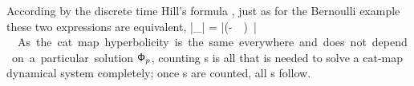 According by the discrete time Hill's formula , just as
for the Bernoulli example  these two expressions are
equivalent,
\beq
|\Det\jMorb_\Mm| = |\det(\unit-\jMps_\Mm)|
\,.
As the cat map hyperbolicity is the same everywhere and
does not depend on a particular solution $\mathsf{\Phi}_p$, counting \po s is all
that is needed to solve a cat-map dynamical system completely; once \po s
are counted, all {\cycForm s} follow.
